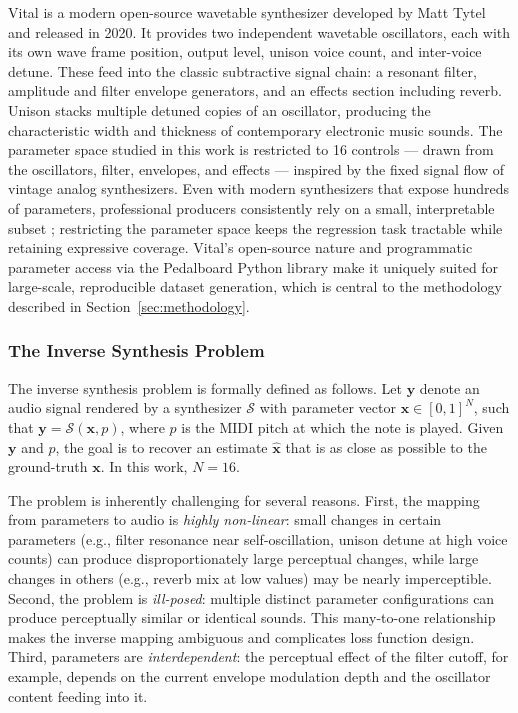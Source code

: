 \noindent Vital is a modern open-source wavetable synthesizer developed by Matt Tytel and released in 2020. It provides two independent wavetable oscillators, each with its own wave frame position, output level, unison voice count, and inter-voice detune. These feed into the classic subtractive signal chain: a resonant filter, amplitude and filter envelope generators, and an effects section including reverb. Unison stacks multiple detuned copies of an oscillator, producing the characteristic width and thickness of contemporary electronic music sounds. The parameter space studied in this work is restricted to 16 controls --- drawn from the oscillators, filter, envelopes, and effects --- inspired by the fixed signal flow of vintage analog synthesizers. Even with modern synthesizers that expose hundreds of parameters, professional producers consistently rely on a small, interpretable subset \cite{cook2002realsound}; restricting the parameter space keeps the regression task tractable while retaining expressive coverage. Vital's open-source nature and programmatic parameter access via the Pedalboard Python library make it uniquely suited for large-scale, reproducible dataset generation, which is central to the methodology described in Section~\ref{sec:methodology}.

\subsubsection{The Inverse Synthesis Problem}

The inverse synthesis problem is formally defined as follows. Let $\mathbf{y}$ denote an audio signal rendered by a synthesizer $\mathcal{S}$ with parameter vector $\mathbf{x} \in [0,1]^N$, such that $\mathbf{y} = \mathcal{S}(\mathbf{x}, p)$, where $p$ is the MIDI pitch at which the note is played. Given $\mathbf{y}$ and $p$, the goal is to recover an estimate $\hat{\mathbf{x}}$ that is as close as possible to the ground-truth $\mathbf{x}$. In this work, $N = 16$.

\par \vspace{0.5cm}

\noindent The problem is inherently challenging for several reasons. First, the mapping from parameters to audio is \textit{highly non-linear}: small changes in certain parameters (e.g., filter resonance near self-oscillation, unison detune at high voice counts) can produce disproportionately large perceptual changes, while large changes in others (e.g., reverb mix at low values) may be nearly imperceptible. Second, the problem is \textit{ill-posed}: multiple distinct parameter configurations can produce perceptually similar or identical sounds. This many-to-one relationship makes the inverse mapping ambiguous and complicates loss function design. Third, parameters are \textit{interdependent}: the perceptual effect of the filter cutoff, for example, depends on the current envelope modulation depth and the oscillator content feeding into it.

